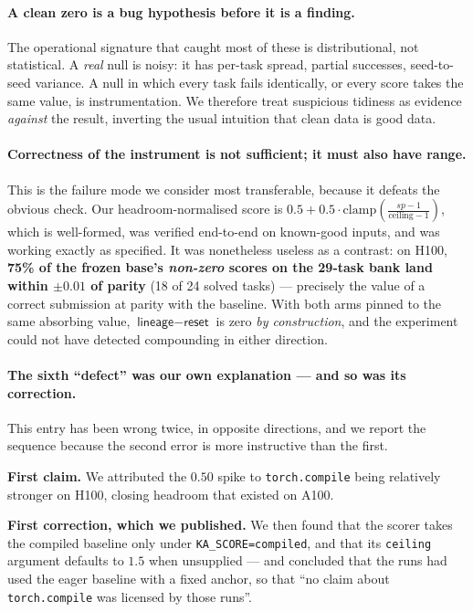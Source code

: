 \paragraph{A clean zero is a bug hypothesis before it is a finding.}
The operational signature that caught most of these is distributional, not statistical. A
\emph{real} null is noisy: it has per-task spread, partial successes, seed-to-seed variance. A
null in which every task fails identically, or every score takes the same value, is
instrumentation. We therefore treat suspicious tidiness as evidence \emph{against} the result,
inverting the usual intuition that clean data is good data.

\paragraph{Correctness of the instrument is not sufficient; it must also have range.}
This is the failure mode we consider most transferable, because it defeats the obvious check.
Our headroom-normalised score is
$0.5 + 0.5\cdot\mathrm{clamp}\!\left(\frac{sp-1}{\mathrm{ceiling}-1}\right)$,
which is well-formed, was verified end-to-end on known-good inputs, and was working exactly as
specified. It was nonetheless useless as a contrast: on H100, \textbf{75\% of the frozen base's \emph{non-zero} scores on the 29-task bank land within $\pm0.01$ of parity} (18 of 24 solved tasks) --- precisely the value of a correct submission at
parity with the baseline. With both arms pinned to the same absorbing value,
$\textsf{lineage}-\textsf{reset}$ is zero \emph{by construction}, and the experiment could not
have detected compounding in either direction.

\paragraph{The sixth ``defect'' was our own explanation --- and so was its correction.}
This entry has been wrong twice, in opposite directions, and we report the sequence because the
second error is more instructive than the first.

\textbf{First claim.} We attributed the $0.50$ spike to \texttt{torch.compile} being relatively
stronger on H100, closing headroom that existed on A100.

\textbf{First correction, which we published.} We then found that the scorer takes the compiled
baseline only under \texttt{KA\_SCORE=compiled}, and that its \texttt{ceiling} argument defaults
to $1.5$ when unsupplied --- and concluded that the runs had used the eager baseline with a
fixed anchor, so that ``no claim about \texttt{torch.compile} was licensed by those runs''.

